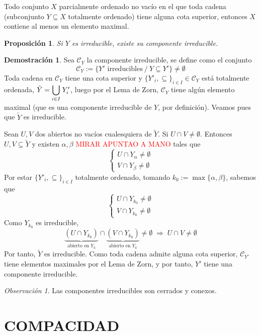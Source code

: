 \documentclass[12pt,twoside]{report}
\newcommand\mc[1]{\mathcal{#1}}
\theoremstyle{azul}
\theoremstyle{azul2}
\theoremstyle{plain}
\newtheorem*{prop}{Proposición}
\theoremstyle{definition}
\newtheorem*{dem}{Demostración}
\theoremstyle{remark}
\newtheorem*{obs}{Observación}
\begin{document}
\begin{tcolorbox}
Todo conjunto $X$ parcialmente ordenado no vacío en el que toda cadena (subconjunto $Y \subseteq X$ totalmente ordenado) tiene alguna cota superior, entonces $X$ contiene al menos un elemento maximal. 
\end{tcolorbox}
\begin{prop}
Si $Y$ es irreducible, existe su componente irreducible.
\end{prop}
\begin{dem}
Sea $\mc{C}_Y$ la componente irreducible, se define como el conjunto 
$$\mc{C}_Y:=\{Y' \text{ irreducibles} \: / \: Y \subseteq Y'\} \neq \emptyset$$
Toda cadena en $\mc{C}_Y$ tiene una cota superior y $\{Y'_i, \subseteq\}_{i\in I} \in \mc{C}_Y$ está totalmente ordenada,  $\tilde{Y} = \underset{i\in I}{\mathlarger{\bigcup}} \; Y_i'$, luego por el Lema de Zorn, $\mc{C}_Y$ tiene algún elemento maximal (que es una componente irreducible de $Y$, por definición). Veamos pues que $\tilde{Y}$ es irreducible.

Sean $U,V$ dos abiertos no vacíos cualesquiera de $\tilde{Y}$. Si $U\cap V\neq \emptyset$. Entonces $U,V\subseteq \tilde{Y}$ y existen $\alpha, \beta$ \textcolor{red}{MIRAR APUNTAO A MANO} tales que
$$\left\{ \begin{array}{l}
     U \cap Y_{\alpha} \neq \emptyset   \\
     V \cap Y_{\beta} \neq \emptyset  
\end{array} \right. $$
Por estar $\{Y'_i, \subseteq\}_{i\in I}$ totalmente ordenado, tomando  $k_0 := \max\{\alpha, \beta\}$, sabemos que
$$\left\{ \begin{array}{l}
     U \cap Y_{k_0} \neq \emptyset   \\
     V \cap Y_{k_0} \neq \emptyset  
\end{array} \right.$$
Como $Y_{k_0}$ es irreducible, 
$$ \underbrace{(U \cap Y_{k_0})}_{\text{abierto en }Y_k} \cap \underbrace{(V \cap Y_{k_0})}_{\text{abierto en }Y_k} \neq \emptyset \; \Rightarrow \; U\cap V \neq \emptyset$$
Por tanto, $\tilde{Y}$ es irreducible. Como toda cadena admite alguna cota superior, $\mc{C}_{Y'}$ tiene elementos maximales por el Lema de Zorn, y por tanto, $Y'$ tiene una componente irreducible.
\end{dem}
\begin{obs}
Las componentes irreducibles son cerrados y conexos.
\end{obs}

\chapter{COMPACIDAD}
\end{document}
